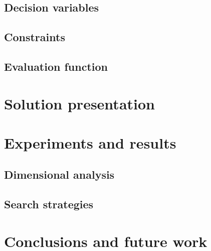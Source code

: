 \documentclass[runningheads]{llncs}
\begin{document}
\subsection{Decision variables}

\subsection{Constraints}

\subsection{Evaluation function}

\section{Solution presentation}

\section{Experiments and results}

\subsection{Dimensional analysis}

\subsection{Search strategies}

\section{Conclusions and future work}

%
%



\end{document}
